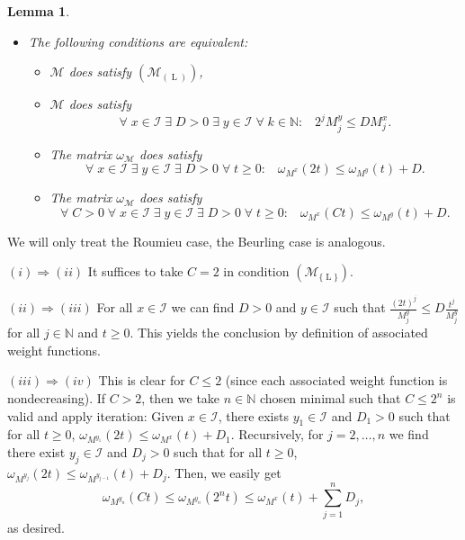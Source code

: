 \documentclass[10pt]{amsart}%
\numberwithin{equation}{section}
\theoremstyle{plain}
\newtheorem{lemma}[proposition]{Lemma}
\newcommand{\NN}{\mathbb{N}}
\let\on=\operatorname
\begin{document}
\begin{lemma}
\begin{itemize}
\item[$(II)$] The following conditions are equivalent:
\begin{itemize}
\item[$(i)$] $\mathcal{M}$ does satisfy \hyperlink{B-L}{$(\mathcal{M}_{(\on{L})})$},

\item[$(ii)$] $\mathcal{M}$ does satisfy
\begin{equation*}%
\forall\;x\in\mathcal{I}\;\exists\;D>0\;\exists\;y\in\mathcal{I}\;\forall\;k\in\NN:\;\;\;2^j M^y_j\le D M^x_j.
\end{equation*}

\item[$(iii)$] The matrix $\omega_{\mathcal{M}}$ does satisfy
\begin{equation}\label{newLroummodomega2}
\forall\; x\in\mathcal{I}\;\exists\;y\in\mathcal{I}\;\exists\; D>0\;\forall\;t\ge 0:\;\;\; \omega_{M^x}(2t)\le \omega_{M^y}(t)+D.
\end{equation}

\item[$(iv)$] The matrix $\omega_{\mathcal{M}}$ does satisfy
\begin{equation*}%
\forall\; C>0\;\forall\; x\in\mathcal{I}\;\exists\;y\in\mathcal{I}\;\exists\; D>0\;\forall\;t\ge 0:\;\;\; \omega_{M^x}(Ct)\le \omega_{M^y}(t)+D.
\end{equation*}
\end{itemize}
\end{itemize}
\end{lemma}

We will only treat the Roumieu case, the Beurling case is analogous.\vspace{6pt}

$(i)\Rightarrow(ii)$ It suffices to take $C=2$ in condition \hyperlink{R-L}{$(\mathcal{M}_{\{\on{L}\}})$}.\vspace{6pt}

$(ii)\Rightarrow(iii)$ For all $x\in\mathcal{I}$ we can find $D>0$ and $y\in\mathcal{I}$ such that $\frac{(2t)^j}{M^y_j}\le D\frac{t^j}{M^y_j}$ for all $j\in\NN$ and $t\ge 0$. This yields the conclusion by definition of associated weight functions.\vspace{6pt}


$(iii)\Rightarrow(iv)$ This is clear for $C\le 2$ (since each associated weight function is nondecreasing). If $C>2$, then we take $n\in\NN$ chosen minimal such that $C\le 2^n$ is valid and apply iteration: Given $x\in\mathcal{I}$, there exists $y_1\in\mathcal{I}$ and $D_1>0$ such that for all $t\ge 0$,
$\omega_{M^{y_1}}(2t)\le \omega_{M^x}(t)+D_1$. Recursively, for $j=2,\dots,n$ we find there exist $y_j\in\mathcal{I}$ and $D_j>0$ such that for all $t\ge 0$,
$\omega_{M^{y_j}}(2t)\le \omega_{M^{y_{j-1}}}(t)+D_j$.
Then, we easily get
$$
\omega_{M^{y_n}}(Ct)\le \omega_{M^{y_n}}(2^nt)\le\omega_{M^x}(t)+\sum_{j=1}^n D_j,
$$
as desired.\vspace{6pt}
\end{document}
